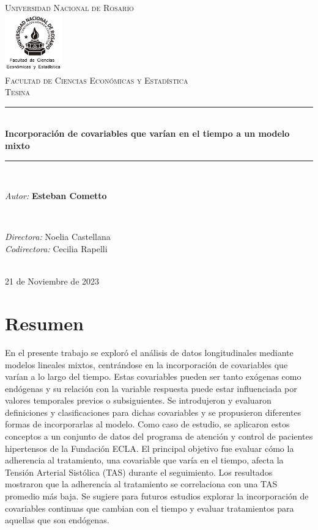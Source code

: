 \documentclass[spanish]{article}
\title{\thesistitle}
\author{\thesisauthorfirst\space\thesisauthorsecond}
\date{\thesisdate}
\numberwithin{figure}{subsection}
\numberwithin{equation}{subsection}
\numberwithin{table}{subsection}
\def\thesistitle{Incorporación de covariables que varían en el tiempo a un modelo mixto}
\def\thesisauthorfirst{\textbf{Esteban Cometto}}
\def\thesissupervisorfirst{Noelia Castellana}
\def\thesissupervisorsecond{Cecilia Rapelli}
\begin{document}
\begin{titlepage}
    \newcommand{\HRule}{\rule{\linewidth}{0.5mm}}
	\center
	\textsc{\Large Universidad Nacional de Rosario}\\[.7cm]
	\includegraphics[width=25mm]{img/fceye-unr.png}\\[.5cm]
	\textsc{Facultad de Ciencias Económicas y Estadística}\\[0.5cm]
	\textsc{Tesina}
	
	\HRule \\[0.4cm]
	{ \huge \bfseries \thesistitle}\\[0.1cm]
	\HRule \\[.5cm]
	
	\begin{minipage}{0.6\textwidth}
	\large
	\textit{Autor:}	\thesisauthorfirst
	\end{minipage}
	\\[.6cm]
	\begin{minipage}{0.6\textwidth}
	\textit{Directora:} 	\thesissupervisorfirst \\[.2cm]
	\textit{Codirectora:} 	\thesissupervisorsecond
	\end{minipage}
	\\[4cm]
	\vfill
	{\large 21 de Noviembre de 2023}\\
	\clearpage
\end{titlepage}

\newpage
\section*{Resumen}

En el presente trabajo se exploró el análisis de datos longitudinales mediante
modelos lineales mixtos, centrándose en la incorporación de covariables que
varían a lo largo del tiempo. Estas covariables pueden ser tanto exógenas como
endógenas y su relación con la variable respuesta puede estar influenciada por
valores temporales previos o subsiguientes. Se introdujeron y evaluaron
definiciones y clasificaciones para dichas covariables y se propusieron
diferentes formas de incorporarlas al modelo. Como caso de estudio, se aplicaron
estos conceptos a un conjunto de datos del programa de atención y control de
pacientes hipertensos de la Fundación ECLA. El principal objetivo fue evaluar
cómo la adherencia al tratamiento, una covariable que varía en el tiempo, afecta
la Tensión Arterial Sistólica (TAS) durante el seguimiento. Los resultados
mostraron que la adherencia al tratamiento se correlaciona con una TAS promedio
más baja. Se sugiere para futuros estudios explorar la incorporación de
covariables continuas que cambian con el tiempo y evaluar tratamientos para
aquellas que son endógenas.
\end{document}
